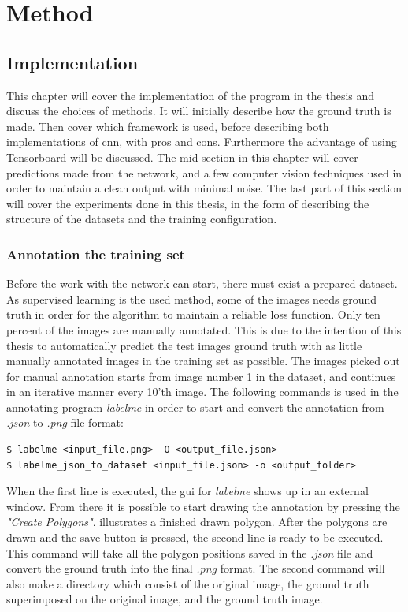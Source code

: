 \documentclass[USenglish]{ifimaster}  %
\begin{document}
\chapter{Method}
\section{Implementation}
This chapter will cover the implementation of the program in the thesis and discuss the choices of methods. It will initially describe how the ground truth is made. Then cover which framework is used, before describing both implementations of \ac{cnn}, with pros and cons. Furthermore the advantage of using Tensorboard will be discussed. The mid section in this chapter will cover predictions made from the network, and a few computer vision techniques used in order to maintain a clean output with minimal noise. The last part of this section will cover the experiments done in this thesis, in the form of describing the structure of the datasets and the training configuration.
\subsection{Annotation the training set}
Before the work with the network can start, there must exist a prepared dataset. As supervised learning is the used method, some of the images needs ground truth in order for the algorithm to maintain a reliable loss function. Only ten percent of the images are manually annotated. This is due to the intention of this thesis to automatically predict the test images ground truth with as little manually annotated images in the training set as possible. The images picked out for manual annotation starts from image number 1 in the dataset, and continues in an iterative manner every 10'th image. The following commands is used in the annotating program \textit{labelme} in order to start and convert the annotation from \textit{.json} to \textit{.png} file format:   

\begin{verbatim}
$ labelme <input_file.png> -O <output_file.json>
$ labelme_json_to_dataset <input_file.json> -o <output_folder>
\end{verbatim}

When the first line is executed, the \ac{gui} for \textit{labelme} shows up in an external window. From there it is possible to start drawing the annotation by pressing the \textit{"Create Polygons"}.  illustrates a finished drawn polygon. After the polygons are drawn and the save button is pressed, the second line is ready to be executed. This command will take all the polygon positions saved in the \textit{.json} file and convert the ground truth into the final \textit{.png} format. The second command will also make a directory which consist of the original image, the ground truth superimposed on the original image, and the ground truth image. 
\end{document}
